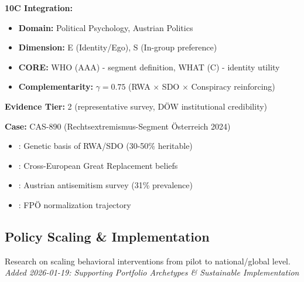 \begin{tcolorbox}[colback=yellow!5!white,colframe=yellow!75!black,title=Key Paper: DÖW Rechtsextremismus-Barometer (2024)]
\textbf{10C Integration:}
\begin{itemize}[nosep]
    \item \textbf{Domain:} Political Psychology, Austrian Politics
    \item \textbf{Dimension:} E (Identity/Ego), S (In-group preference)
    \item \textbf{CORE:} WHO (AAA) - segment definition, WHAT (C) - identity utility
    \item \textbf{Complementarity:} $\gamma = 0.75$ (RWA $\times$ SDO $\times$ Conspiracy reinforcing)
\end{itemize}

\textbf{Evidence Tier:} 2 (representative survey, DÖW institutional credibility)

\textbf{Case:} CAS-890 (Rechtsextremismus-Segment Österreich 2024)
\end{tcolorbox}

\begin{tcolorbox}[colback=gray!10!white,colframe=gray!75!black,title=Related Papers in This Cluster]
\begin{itemize}[nosep]
    \item \citet{PAP-kleppestoe2024genetic}: Genetic basis of RWA/SDO (30-50\% heritable)
    \item \citet{PAP-herold2025replacement}: Cross-European Great Replacement beliefs
    \item \citet{PAP-ifes2022antisemitismus}: Austrian antisemitism survey (31\% prevalence)
    \item \citet{PAP-weisskircher2025normalised}: FPÖ normalization trajectory
\end{itemize}
\end{tcolorbox}

\subsection{Policy Scaling \& Implementation}
\label{subsec:ot-policy-scaling}

Research on scaling behavioral interventions from pilot to national/global level.
\textit{Added 2026-01-19: Supporting Portfolio Archetypes \& Sustainable Implementation}

